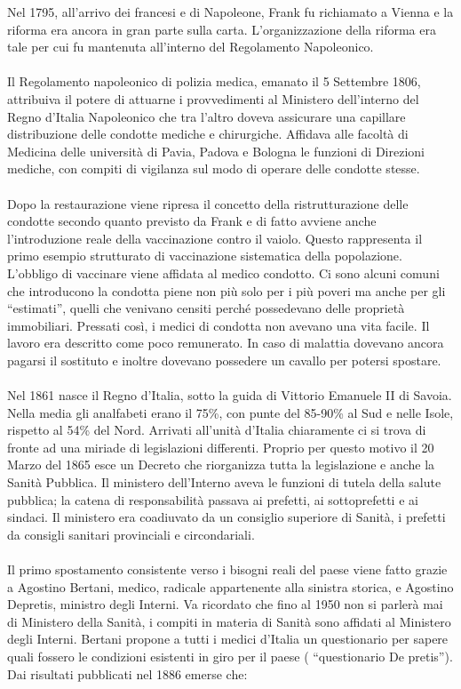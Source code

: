 Nel 1795, all'arrivo dei francesi e di Napoleone, Frank fu richiamato a
Vienna e la riforma era ancora in gran parte sulla carta.
L'organizzazione della riforma era tale per cui fu mantenuta all'interno
del Regolamento Napoleonico.
\\\\
Il Regolamento napoleonico di polizia medica, emanato il 5 Settembre
1806, attribuiva il potere di attuarne i provvedimenti al Ministero
dell'interno del Regno d'Italia Napoleonico che tra l'altro doveva
assicurare una capillare distribuzione delle condotte mediche e
chirurgiche. Affidava alle facoltà di Medicina delle università di
Pavia, Padova e Bologna le funzioni di Direzioni mediche, con compiti di
vigilanza sul modo di operare delle condotte stesse.
\\\\
Dopo la restaurazione viene ripresa il concetto della ristrutturazione
delle condotte secondo quanto previsto da Frank e di fatto avviene anche
l'introduzione reale della vaccinazione contro il vaiolo. Questo
rappresenta il primo esempio strutturato di vaccinazione sistematica
della popolazione. L'obbligo di vaccinare viene affidata al medico
condotto. Ci sono alcuni comuni che introducono la condotta piene non
più solo per i più poveri ma anche per gli ``estimati'', quelli che
venivano censiti perché possedevano delle proprietà immobiliari.
Pressati così, i medici di condotta non avevano una vita facile. Il
lavoro era descritto come poco remunerato. In caso di malattia dovevano
ancora pagarsi il sostituto e inoltre dovevano possedere un cavallo per
potersi spostare.
\\\\
Nel 1861 nasce il Regno d'Italia, sotto la guida di Vittorio Emanuele II
di Savoia. Nella media gli analfabeti erano il 75\%, con punte del
85-90\% al Sud e nelle Isole, rispetto al 54\% del Nord. Arrivati
all'unità d'Italia chiaramente ci si trova di fronte ad una miriade di
legislazioni differenti. Proprio per questo motivo il 20 Marzo del 1865
esce un Decreto che riorganizza tutta la legislazione e anche la Sanità
Pubblica. Il ministero dell'Interno aveva le funzioni di tutela della
salute pubblica; la catena di responsabilità passava ai prefetti, ai
sottoprefetti e ai sindaci. Il ministero era coadiuvato da un consiglio
superiore di Sanità, i prefetti da consigli sanitari provinciali e
circondariali.
\\\\
Il primo spostamento consistente verso i bisogni reali del paese viene
fatto grazie a Agostino Bertani, medico, radicale appartenente alla
sinistra storica, e Agostino Depretis, ministro degli Interni. Va
ricordato che fino al 1950 non si parlerà mai di Ministero della Sanità,
i compiti in materia di Sanità sono affidati al Ministero degli Interni.
Bertani propone a tutti i medici d'Italia un questionario per sapere
quali fossero le condizioni esistenti in giro per il paese (
``questionario De pretis''). Dai risultati pubblicati nel 1886 emerse
che:

